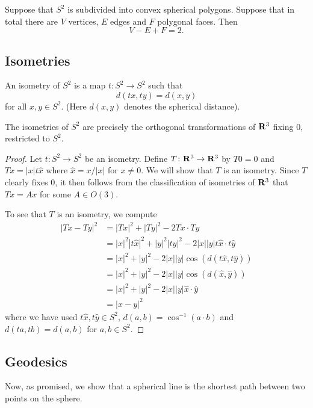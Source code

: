 \documentclass[12pt]{article}
\begin{document}
\begin{cor}
  Suppose that $S^2$ is subdivided into convex spherical polygons. Suppose that in total there are $V$ vertices, $E$ edges and $F$ polygonal faces. Then
  \[V-E+F=2.\]
\end{cor}

\subsection{Isometries}

\begin{dfn}
  An isometry of $S^2$ is a map $t\colon S^2\to S^2$ such that
  \[d(tx,ty)=d(x,y)\]
  for all $x,y\in S^2$. (Here $d(x,y)$ denotes the spherical distance).
\end{dfn}

\begin{thm}
  The isometries of $S^2$ are precisely the orthogonal transformations of $\mathbf{R}^3$ fixing $0$, restricted to $S^2$.
\end{thm}
\begin{proof}
  Let $t\colon S^2\to S^2$ be an isometry. Define $T\colon\mathbf{R}^3\to\mathbf{R}^3$ by $T0=0$ and $Tx=|x|t\hat{x}$ where $\hat{x}=x/|x|$ for $x\neq 0$. We will show that $T$ is an isometry. Since $T$ clearly fixes $0$, it then follows from the classification of isometries of $\mathbf{R}^3$ that $Tx=Ax$ for some $A\in O(3)$.

  To see that $T$ is an isometry, we compute
  \begin{align*}
    |Tx-Ty|^2&=|Tx|^2+|Ty|^2-2Tx\cdot Ty\\
    &=|x|^2|t\hat{x}|^2+|y|^2|t\hat{y}|^2-2|x||y|t\hat{x}\cdot t\hat{y}\\
    &=|x|^2+|y|^2-2|x||y|\cos(d(t\hat{x},t\hat{y}))\\
    &=|x|^2+|y|^2-2|x||y|\cos(d(\hat{x},\hat{y}))\\
    &=|x|^2+|y|^2-2|x||y|\hat{x}\cdot\hat{y}\\
    &=|x-y|^2
  \end{align*}
  where we have used $t\hat{x},t\hat{y}\in S^2$, $d(a,b)=\cos^{-1}(a\cdot b)$ and $d(ta,tb)=d(a,b)$ for $a,b\in S^2$.
\end{proof}

\subsection{Geodesics}

Now, as promised, we show that a spherical line is the shortest path between two points on the sphere.
\end{document}
